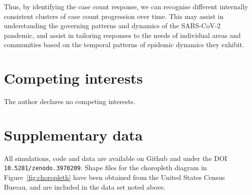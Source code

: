 \documentclass{article}
\begin{document}
Thus, by identifying the case count response, we can recognise different internally consistent clusters of case count progression over time. This may assist in understanding the governing patterns and dynamics of the SARS-CoV-2 pandemic, and assist in tailoring responses to the needs of individual areas and communities based on the temporal patterns of epidemic dynamics they exhibit.


\section*{Competing interests} %
\label{sec:competing_interests}

The author declares no competing interests.


\section*{Supplementary data} %
\label{sec:supplementary_data}

All simulations, code and data are available on Github and under the DOI \texttt{10.5281/zenodo.3970209}. Shape files for the choropleth diagram in Figure~\ref{fig:choropleth} have been obtained from the United States Census Bureau, and are included in the data set noted above.



\end{document}
